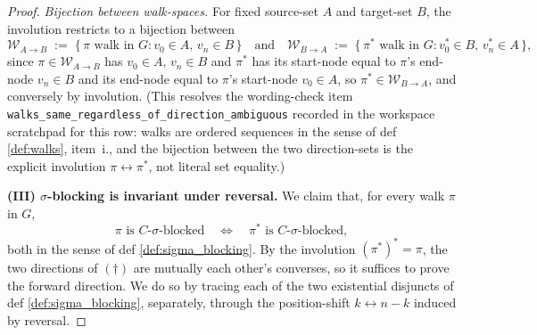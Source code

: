 \documentclass[main]{subfiles}
\begin{document}
\begin{proof}
\smallskip\noindent\emph{Bijection between walk-spaces.}
For fixed source-set $A$ and target-set $B$, the involution restricts to a bijection between
\[
    \mathcal{W}_{A \to B} \;:=\; \{\,\pi \text{ walk in } G : v_0 \in A,\, v_n \in B\,\}
    \quad\text{and}\quad
    \mathcal{W}_{B \to A} \;:=\; \{\,\pi^* \text{ walk in } G : v_0^* \in B,\, v_n^* \in A\,\},
\]
since $\pi \in \mathcal{W}_{A \to B}$ has $v_0 \in A,\, v_n \in B$ and $\pi^*$ has its start-node equal to $\pi$'s end-node $v_n \in B$ and its end-node equal to $\pi$'s start-node $v_0 \in A$, so $\pi^* \in \mathcal{W}_{B \to A}$, and conversely by involution. (This resolves the wording-check item \texttt{walks\_same\_regardless\_of\_direction\_ambiguous} recorded in the workspace scratchpad for this row: walks are ordered sequences in the sense of def \ref{def:walks}, item~i., and the bijection between the two direction-sets is the explicit involution $\pi \leftrightarrow \pi^*$, not literal set equality.)

\medskip\noindent\textbf{(III) $\sigma$-blocking is invariant under reversal.}
We claim that, for every walk $\pi$ in $G$,
\[
    \pi \text{ is } C\text{-}\sigma\text{-blocked}
    \quad\iff\quad
    \pi^* \text{ is } C\text{-}\sigma\text{-blocked},
\tag{$\dagger$}
\]
both in the sense of def \ref{def:sigma_blocking}. By the involution $(\pi^*)^* = \pi$, the two directions of $(\dagger)$ are mutually each other's converses, so it suffices to prove the forward direction. We do so by tracing each of the two existential disjuncts of def \ref{def:sigma_blocking}, separately, through the position-shift $k \leftrightarrow n - k$ induced by reversal.


\end{proof}
\end{document}
